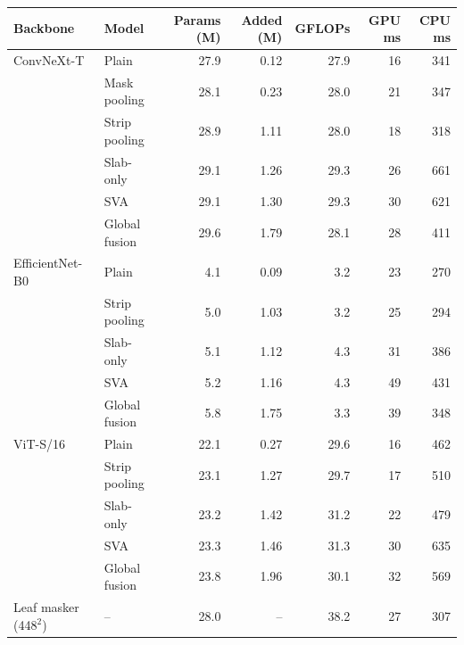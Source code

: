 \begin{tabular}{llrrrrr}
\toprule
Backbone & Model & Params (M) & Added (M) & GFLOPs & GPU ms & CPU ms \\
\midrule
ConvNeXt-T & Plain & 27.9 & 0.12 & 27.9 & 16 & 341 \\
 & Mask pooling & 28.1 & 0.23 & 28.0 & 21 & 347 \\
 & Strip pooling & 28.9 & 1.11 & 28.0 & 18 & 318 \\
 & Slab-only & 29.1 & 1.26 & 29.3 & 26 & 661 \\
 & SVA & 29.1 & 1.30 & 29.3 & 30 & 621 \\
 & Global fusion & 29.6 & 1.79 & 28.1 & 28 & 411 \\
\midrule
EfficientNet-B0 & Plain & 4.1 & 0.09 & 3.2 & 23 & 270 \\
 & Strip pooling & 5.0 & 1.03 & 3.2 & 25 & 294 \\
 & Slab-only & 5.1 & 1.12 & 4.3 & 31 & 386 \\
 & SVA & 5.2 & 1.16 & 4.3 & 49 & 431 \\
 & Global fusion & 5.8 & 1.75 & 3.3 & 39 & 348 \\
\midrule
ViT-S/16 & Plain & 22.1 & 0.27 & 29.6 & 16 & 462 \\
 & Strip pooling & 23.1 & 1.27 & 29.7 & 17 & 510 \\
 & Slab-only & 23.2 & 1.42 & 31.2 & 22 & 479 \\
 & SVA & 23.3 & 1.46 & 31.3 & 30 & 635 \\
 & Global fusion & 23.8 & 1.96 & 30.1 & 32 & 569 \\
\midrule
Leaf masker (448$^2$) & -- & 28.0 & -- & 38.2 & 27 & 307 \\
\bottomrule
\end{tabular}